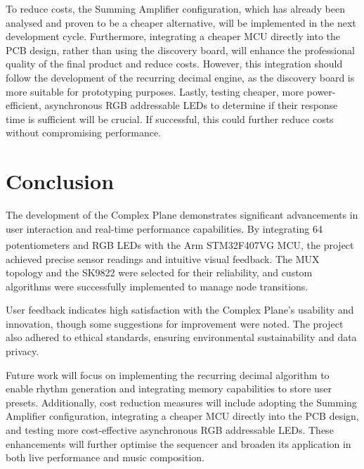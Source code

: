 \documentclass[12pt]{article}
\numberwithin{subsubsubsection}{subsubsection}
\begin{document}
To reduce costs, the Summing Amplifier configuration, which has already been analysed and proven to be a cheaper alternative, will be implemented in the next development cycle. Furthermore, integrating a cheaper MCU directly into the PCB design, rather than using the discovery board, will enhance the professional quality of the final product and reduce costs. However, this integration should follow the development of the recurring decimal engine, as the discovery board is more suitable for prototyping purposes. Lastly, testing cheaper, more power-efficient, asynchronous RGB addressable LEDs to determine if their response time is sufficient will be crucial. If successful, this could further reduce costs without compromising performance.



\newpage
\section{Conclusion}
The development of the Complex Plane demonstrates significant advancements in user interaction and real-time performance capabilities. By integrating 64 potentiometers and RGB LEDs with the Arm\textsuperscript{\textregistered} STM32F407VG MCU, the project achieved precise sensor readings and intuitive visual feedback. The MUX topology and the SK9822 were selected for their reliability, and custom algorithms were successfully implemented to manage node transitions.

User feedback indicates high satisfaction with the Complex Plane's usability and innovation, though some suggestions for improvement were noted. The project also adhered to ethical standards, ensuring environmental sustainability and data privacy.

Future work will focus on implementing the recurring decimal algorithm to enable rhythm generation and integrating memory capabilities to store user presets. Additionally, cost reduction measures will include adopting the Summing Amplifier configuration, integrating a cheaper MCU directly into the PCB design, and testing more cost-effective asynchronous RGB addressable LEDs. These enhancements will further optimise the sequencer and broaden its application in both live performance and music composition.


\newpage






\newpage
\appendix
\end{document}
